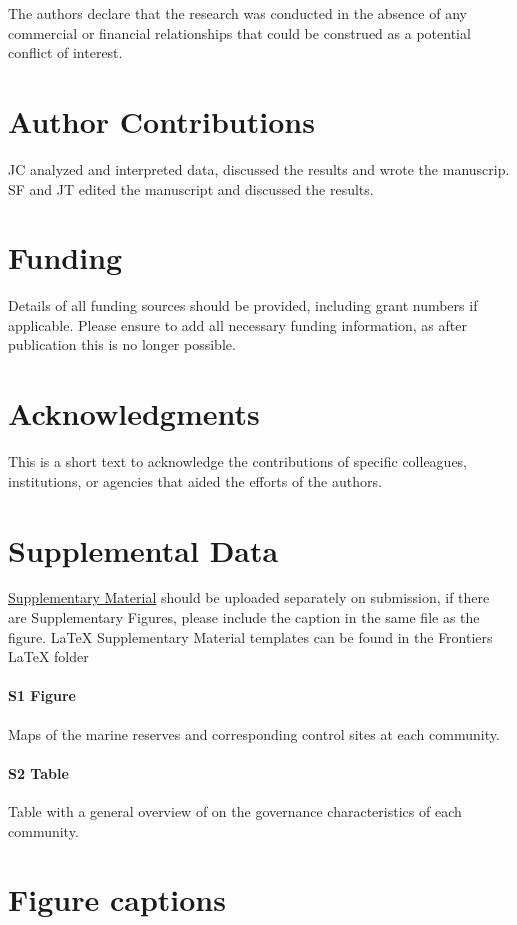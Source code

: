 \documentclass{frontiersSCNS}
\theoremstyle{definition}
\theoremstyle{definition}
\theoremstyle{definition}
\theoremstyle{remark}
\begin{document}
The authors declare that the research was conducted in the absence of
any commercial or financial relationships that could be construed as a
potential conflict of interest.

\section*{Author Contributions}

JC analyzed and interpreted data, discussed the results and wrote the
manuscrip. SF and JT edited the manuscript and discussed the results.

\section*{Funding}

Details of all funding sources should be provided, including grant
numbers if applicable. Please ensure to add all necessary funding
information, as after publication this is no longer possible.

\section*{Acknowledgments}

This is a short text to acknowledge the contributions of specific
colleagues, institutions, or agencies that aided the efforts of the
authors.

\section*{Supplemental Data}

\href{http://home.frontiersin.org/about/author-guidelines#SupplementaryMaterial}{Supplementary Material}
should be uploaded separately on submission, if there are Supplementary
Figures, please include the caption in the same file as the figure.
LaTeX Supplementary Material templates can be found in the Frontiers
LaTeX folder

\paragraph*{S1 Figure}
\label{S1_Figure}

Maps of the marine reserves and corresponding control sites at each
community.

\paragraph*{S2 Table}
\label{S2_Table}

Table with a general overview of on the governance characteristics of
each community.



\section*{Figure captions}
\end{document}
